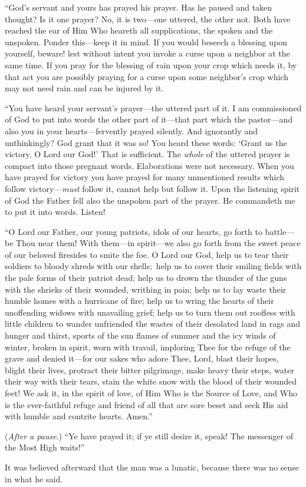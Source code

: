 ``God's servant and yours has prayed his prayer. Has he paused and
taken thought? Is it one prayer? No, it is two---one uttered, the
other not. Both have reached the ear of Him Who heareth all
supplications, the spoken and the unspoken. Ponder this---keep it in
mind. If you would beseech a blessing upon yourself, beware! lest
without intent you invoke a curse upon a neighbor at the same time. If
you pray for the blessing of rain upon your crop which needs it, by
that act you are possibly praying for a curse upon some neighbor's
crop which may not need rain and can be injured by it.

``You have heard your servant's prayer---the uttered part of it. I am
commissioned of God to put into words the other part of it---that part
which the pas\-tor---and also you in your hearts---fervently prayed
silently. And ignorantly and unthinkingly? God grant that it was so!
You heard these words: `Grant us the victory, O Lord our God!' That is
sufficient. The \textit{whole} of the uttered prayer is compact into
those pregnant words. Elaborations were not necessary. When you have
prayed for victory you have prayed for many unmentioned results which
follow vic\-to\-ry---\textit{must} follow it, cannot help but follow
it. Upon the listening spirit of God the Father fell also the unspoken
part of the prayer. He commandeth me to put it into words. Listen!

``O Lord our Father, our young patriots, idols of  our
hearts, go forth to bat\-tle---be Thou near them! With them---in
spir\-it---we also go forth from the sweet peace of our beloved
firesides to smite the foe. O Lord our God, help us to tear their
soldiers to bloody shreds with our shells; help us to cover their
smiling fields with the pale forms of their patriot dead; help us to
drown the thunder of the guns with the shrieks of their wounded,
writhing in pain; help us to lay waste their humble homes with a
hurricane of fire; help us to wring the hearts of their unoffending
widows with unavailing grief; help us to turn them out roofless with
little children to wander unfriended the wastes of their desolated
land in rags and hunger and thirst, sports of the sun flames of summer
and the icy winds of winter, broken in spirit, worn with travail,
imploring Thee for the refuge of the grave and denied it---for our
sakes who adore Thee, Lord, blast their hopes, blight their lives,
protract their bitter pilgrimage, make heavy their steps, water their
way with their tears, stain the white snow with the blood of their
wounded feet! We ask it, in the spirit of love, of Him Who is the
Source of Love, and Who is the ever-faithful refuge and friend of all
that are sore beset and seek His aid with humble and contrite hearts.
Amen.''

(\textit{After a pause}.) ``Ye have prayed it; if ye still desire it,
speak! The messenger of the Most High waits!''

It was believed afterward that the man was a lunatic, because there
was no sense in what he said.

